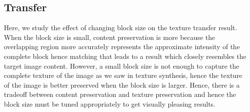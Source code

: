 \documentclass[10pt,twocolumn,letterpaper]{article}
\begin{document}



\subsection{Transfer}
Here, we study the effect of changing block size on the texture transfer result. When the block size is small, content preservation is more because the overlapping region more accurately represents the approximate intensity of the complete block hence matching that leads to a result which closely resembles the target image content. However, a small block size is not enough to capture the complete texture of the image as we saw in texture synthesis, hence the texture of the image is better preserved when the block size is larger. Hence, there is a tradeoff between content preservation and texture preservation and hence the block size must be tuned appropriately to get visually pleasing results.
\end{document}
